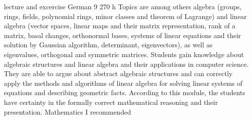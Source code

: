 {lecture and excercise}
{German}
{9}
{270 h}
{Topics are among others algebra (groups, rings, fields, polynomial rings, minor classes and theorem of Lagrange) and linear algebra (vector spaces, linear maps and their matrix representation, rank of a matrix, basal changes, orthonormal bases, systems of linear equations and their solution by Gaussian algorithm, determinant, eigenvectors), as well as eigenvalues, orthogonal and symmetric matrices.}
{Students gain knowledge about algebraic structures and linear algebra and their applications in computer science. They are able to argue about abstract algebraic structures and can correctly apply the methods and algorithms of linear algebra for solving linear systems of equations and describing geometric facts. According to this module, the students have certainty in the formally correct mathematical reasoning and their presentation.}
{Mathematics I recommended}